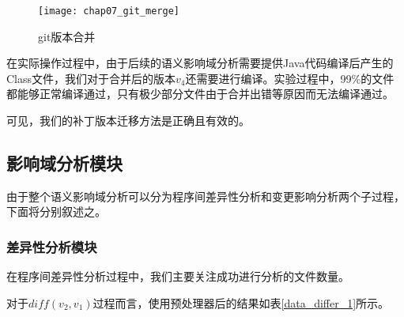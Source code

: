\begin{figure}[H]
	\centering
	\texttt{[image: chap07\_git\_merge]}
	\caption {git版本合并}
	\label {exp_git_merge}	
\end{figure}

在实际操作过程中，由于后续的语义影响域分析需要提供Java代码编译后产生的Class文件，我们对于合并后的版本$v_4$还需要进行编译。实验过程中，99\%的文件都能够正常编译通过，只有极少部分文件由于合并出错等原因而无法编译通过。

可见，我们的补丁版本迁移方法是正确且有效的。

%
%

\subsection{影响域分析模块}

由于整个语义影响域分析可以分为程序间差异性分析和变更影响分析两个子过程，下面将分别叙述之。

\subsubsection{差异性分析模块}

在程序间差异性分析过程中，我们主要关注成功进行分析的文件数量。

对于$diff(v_2,v_1)$过程而言，使用预处理器后的结果如表\ref {data_differ_1}所示。

